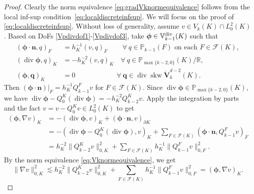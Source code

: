 \documentclass[10pt]{amsart}
\renewcommand{\div}{\operatorname{div}}
\newcommand{\skw}{\operatorname{skw}}
\numberwithin{equation}{section}
\begin{document}
\begin{proof}
Clearly the norm equivalence \eqref{eq:gradVknormequivalence} follows from the local inf-sup condition~\eqref{eq:localdiscreteinfsup}. We will focus on the proof of \eqref{eq:localdiscreteinfsup}.
Without loss of generality, assume $v\in V_k(K)\cap L_0^2(K)$.
Based on DoFs \eqref{Vpdivdof1}-\eqref{Vpdivdof3}, take $\boldsymbol{\phi}\in\mathbb{V}_{k-1}^{\rm div}(K)$ such that
\begin{align*}
(\boldsymbol{\phi}\cdot\boldsymbol{n}, q)_F&=h_K^{-1}(v, q)_F  \quad\quad\,\forall~q\in\mathbb P_{k-1}(F) \textrm{ on each }  F\in\mathcal F(K), \\
(\div\boldsymbol{\phi}, q)_K&=-h_K^{-2}(v, q)_K  \quad\forall~q\in\mathbb P_{\max\{k-2,0\}}(K)/\mathbb R, \\
(\boldsymbol{\phi}, \boldsymbol{q})_K&=0  \qquad\qquad\qquad\forall~\boldsymbol{q}\in \div\skw\mathring{\boldsymbol{V}}_{k}^{d-2}(K). 
\end{align*}
Then $(\boldsymbol{\phi}\cdot\boldsymbol{n})|_{F}=h_K^{-1}Q_{k-1}^Fv$ for $F\in\mathcal F(K)$. Since $\div\boldsymbol{\phi}\in \mathbb P_{\max\{k-2,0\}}(K)$, we have $\div\boldsymbol{\phi}-Q_{0}^K(\div\boldsymbol{\phi})=-h_K^{-2}Q_{k-2}^Kv$. Apply the integration by parts and the fact $v=v-Q_{0}^Kv\in L_0^2(K)$ to get
\begin{align*}
(\boldsymbol{\phi}, \nabla v)_K&=-(\div\boldsymbol{\phi}, v)_K + (\boldsymbol{\phi}\cdot\boldsymbol{n}, v)_{\partial K} \\
&=-(\div\boldsymbol{\phi}-Q_{0}^K(\div\boldsymbol{\phi}), v)_K+\sum_{F\in\mathcal F(K)}(\boldsymbol{\phi}\cdot\boldsymbol{n}, Q_{k-1}^Fv)_{F} \\
&=h_K^{-2}\|Q_{k-2}^Kv\|_{0,K}^2+\sum_{F\in\mathcal F(K)}h_K^{-1}\|Q_{k-1}^Fv\|_{0,F}^2.
\end{align*}
By the norm equivalence \eqref{eq:Vknormequivalence}, we get
\begin{equation}\label{eq:20220204}
\|\nabla v\|_{0,K}^{2}\lesssim h_K^{-2}\|Q_{k-2}^Kv\|_{0,K}^2+\sum_{F\in\mathcal F(K)}h_K^{-1}\|Q_{k-1}^Fv\|_{0,F}^2= (\boldsymbol{\phi}, \nabla v)_K.
\end{equation}


\end{proof}
\end{document}
